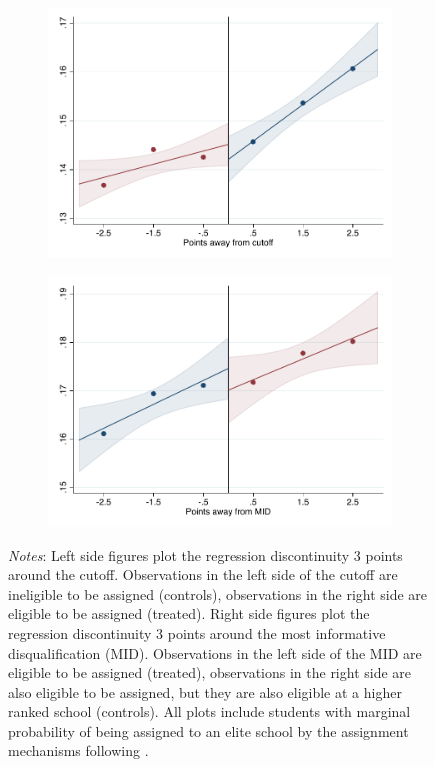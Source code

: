 \documentclass[oneside,11pt]{article}
\begin{document}
\begin{figure}[H]
\begin{center}
    \begin{subfigure}{0.475\textwidth}
        \centering
        \includegraphics[width=\textwidth]{04_Figures/rd_plot_tau_Secundaria_Privada_UNAM3.pdf}
    \end{subfigure}
    \begin{subfigure}{0.475\textwidth}
        \centering
        \includegraphics[width=\textwidth]{04_Figures/rd_plot_mid_Secundaria_Privada_UNAM3.pdf}
    \end{subfigure}
    \end{center}
    
\footnotesize
\textit{Notes}: Left side figures plot the regression discontinuity 3 points around the cutoff. Observations in the left side of the cutoff are ineligible to be assigned (controls), observations in the right side are eligible to be assigned (treated). Right side figures plot the regression discontinuity 3 points around the most informative disqualification (MID). Observations in the left side of the MID are eligible to be assigned (treated), observations in the right side are also eligible to be assigned, but they are also eligible at a higher ranked school (controls). All plots include students with marginal probability of being assigned to an elite school by the assignment mechanisms following \citet{abdulkadirouglu2022breaking}. 
\end{figure}
\end{document}
